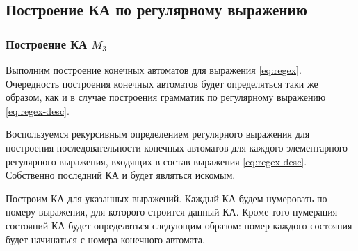 \subsection{Построение КА по регулярному выражению}
\subsubsection{Построение КА \(M_3\)}
Выполним построение конечных автоматов для выражения \cref{eq:regex}. Очередность построения конечных автоматов будет определяться таки же образом, как и в случае построения грамматик по регулярному выражению \cref{eq:regex-desc}.

Воспользуемся рекурсивным определением регулярного выражения для построения последовательности конечных автоматов для каждого элементарного регулярного выражения, входящих в состав выражения \cref{eq:regex-desc}. Собственно последний КА и будет являться искомым.

Построим КА для указанных выражений. Каждый КА будем нумеровать по номеру выражения, для которого строится данный  КА. Кроме того нумерация состояний КА будет определяться следующим образом: номер каждого состояния будет начинаться с номера конечного автомата.







